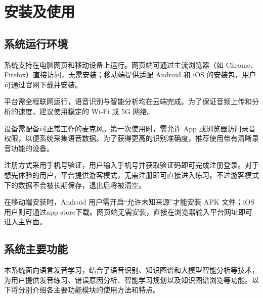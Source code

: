 \chapter{安装及使用}
\section{系统运行环境}
系统支持在电脑网页和移动设备上运行。网页端可通过主流浏览器（如 Chrome、Firefox）直接访问，无需安装；移动端提供适配 Android 和 iOS 的安装包，用户可通过官网下载并安装。

平台需全程联网运行，语音识别与智能分析均在云端完成。为了保证音频上传和分析的速度，建议使用稳定的 Wi-Fi 或 5G 网络。

设备需配备可正常工作的麦克风。第一次使用时，需允许 App 或浏览器访问录音权限，以便系统采集语音数据。为了获得更高的识别准确度，推荐使用带有清晰录音功能的设备。

注册方式采用手机号验证，用户输入手机号并获取验证码即可完成注册登录。对于想先体验的用户，平台提供游客模式，无需注册即可直接进入练习。不过游客模式下的数据不会被长期保存，退出后将被清空。

在移动端安装时，Android 用户需开启“允许未知来源”才能安装 APK 文件；iOS 用户则可通过app store下载。网页端无需安装，直接在浏览器输入平台网址即可进入主界面。

\section{系统主要功能}
本系统面向语言发音学习，结合了语音识别、知识图谱和大模型智能分析等技术，为用户提供发音练习、错误原因分析、智能学习规划以及知识图谱浏览等功能。以下将分别介绍各主要功能模块的使用方法和特点。

